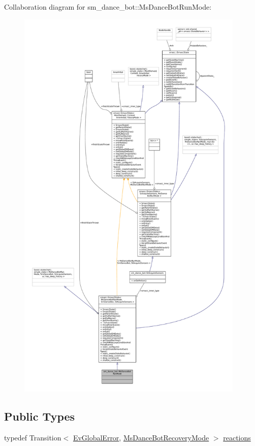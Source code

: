 Collaboration diagram for sm\+\_\+dance\+\_\+bot\+:\+:Ms\+Dance\+Bot\+Run\+Mode\+:
\nopagebreak
\begin{figure}[H]
\begin{center}
\leavevmode
\includegraphics[height=550pt]{classsm__dance__bot_1_1MsDanceBotRunMode__coll__graph}
\end{center}
\end{figure}
\subsection*{Public Types}
\begin{DoxyCompactItemize}
\item 
typedef Transition$<$ \hyperlink{structsm__dance__bot_1_1EvGlobalError}{Ev\+Global\+Error}, \hyperlink{classsm__dance__bot_1_1MsDanceBotRecoveryMode}{Ms\+Dance\+Bot\+Recovery\+Mode} $>$ \hyperlink{classsm__dance__bot_1_1MsDanceBotRunMode_a719e14916aaff2ff6482b666f55027b7}{reactions}
\end{DoxyCompactItemize}
